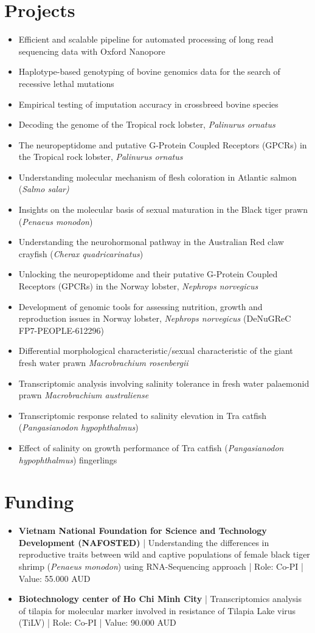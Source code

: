 \documentclass[letterpaper,11pt]{article}
\newcommand{\resumeBlack}[1]{\item\small{{#1}}}
\newcommand{\resumeItemListStart}{\begin{itemize}}
\newcommand{\resumeItemListEnd}{\end{itemize}}
\begin{document}
\section{Projects}
  \resumeItemListStart
    \resumeBlack{Efficient and scalable pipeline for automated processing of long read sequencing data with Oxford Nanopore}  
    \resumeBlack{Haplotype-based genotyping of bovine genomics data for the search of recessive lethal mutations}  
    \resumeBlack{Empirical testing of imputation accuracy in crossbreed bovine species}
    \resumeBlack{Decoding the genome of the Tropical rock lobster, \textit{Palinurus ornatus}}
    \resumeBlack{The neuropeptidome and putative G-Protein Coupled Receptors (GPCRs) in the Tropical rock lobster, \textit{Palinurus ornatus}}
    \resumeBlack{Understanding molecular mechanism of flesh coloration in Atlantic salmon (\textit{Salmo salar)}}
    \resumeBlack{Insights on the molecular basis of sexual maturation in the Black tiger prawn (\textit{Penaeus monodon})}
    \resumeBlack{Understanding the neurohormonal pathway in the Australian Red claw crayfish (\textit{Cherax quadricarinatus})}
    \resumeBlack{Unlocking the neuropeptidome and their putative G-Protein Coupled Receptors (GPCRs) in the Norway lobster, \textit{Nephrops norvegicus}}
    \resumeBlack{Development of genomic tools for assessing nutrition, growth and reproduction issues in Norway lobster, \textit{Nephrops norvegicus} (DeNuGReC FP7-PEOPLE-612296)}
    \resumeBlack{Differential morphological characteristic/sexual characteristic of the giant fresh water prawn \textit{Macrobrachium rosenbergii}}
    \resumeBlack{Transcriptomic analysis involving salinity tolerance in fresh water palaemonid prawn \textit{Macrobrachium australiense}}
    \resumeBlack{Transcriptomic response related to salinity elevation in Tra catfish (\textit{Pangasianodon hypophthalmus})}
    \resumeBlack{Effect of salinity on growth performance of Tra catfish (\textit{Pangasianodon hypophthalmus}) fingerlings}
  \resumeItemListEnd

\section{Funding}
 \resumeItemListStart
   \resumeBlack{\textbf{Vietnam National Foundation for Science and Technology Development (NAFOSTED)} | Understanding the differences in reproductive traits between wild and captive populations of female black tiger shrimp (\textit{Penaeus monodon}) using RNA-Sequencing approach | Role: Co-PI | Value: 55.000 AUD}
    \resumeBlack{\textbf{Biotechnology center of Ho Chi Minh City } | Transcriptomics analysis of tilapia for molecular marker involved in resistance of Tilapia Lake virus (TiLV) | Role: Co-PI | Value: 90.000 AUD}
  \resumeItemListEnd
  
\end{document}
